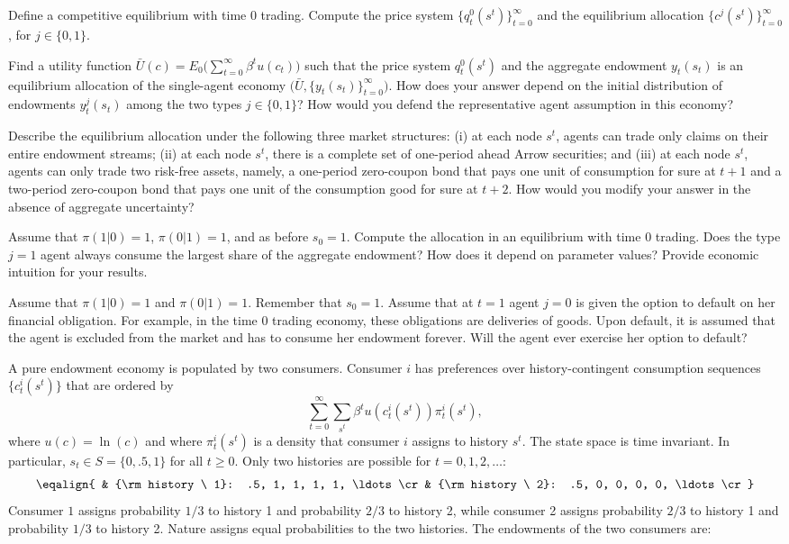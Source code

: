  Define a competitive equilibrium with time $0$
trading. Compute the price system $\{q_t^0(s^t)\}_{t=0}^{\infty}$
and the equilibrium allocation $\{c^j(s^t)\}_{t=0}^{\infty}$, for
$j \in \{0,1\}$.\medskip

 Find a utility function $\bar U(c) = E_0\bigl(
\sum_{t=0}^{\infty} \beta^t u(c_t) \bigr)$ such that the price
system $q_t^0(s^t)$ and the aggregate endowment $y_t(s_t)$ is an
equilibrium allocation of the single-agent economy $\bigl( \bar U
,\{y_t(s_t)\}_{t=0}^{\infty} \bigr)$. How does your answer depend
on the initial distribution of endowments $y_t^j(s_t)$ among the
two types $j \in \{0,1\}$? How would you defend the
representative agent assumption in this economy?\medskip

 Describe the equilibrium allocation under the
following three market structures: (i) at each node $s^t$,
agents can  trade only claims on their entire endowment streams;
(ii) at each node $s^t$, there is a complete set of one-period
ahead Arrow securities; and (iii) at each node $s^t$, agents can
only trade two risk-free assets, namely, a one-period zero-coupon bond
that pays one unit of consumption for sure at $t+1$ and a
two-period zero-coupon bond that pays one unit of the consumption good
for sure at $t+2$. How would you modify your answer in the absence
of aggregate uncertainty?\medskip

 Assume that $\pi(1|0)=1$, $\pi(0|1)=1$, and as
before $s_0=1$. Compute the allocation in an equilibrium with
time $0$ trading. Does the type $j=1$ agent always consume the
largest share of the aggregate endowment? How does it depend on
parameter values? Provide economic intuition for your results.\medskip

 Assume that $\pi(1|0)=1$ and $\pi(0|1)=1$.
Remember that $s_0=1$. Assume that at $t=1$ agent $j=0$ is given
the option to default on her financial obligation. For example, in
the time $0$ trading economy, these obligations are deliveries of
goods. Upon default, it is assumed that the agent is excluded from
the market and has to consume her endowment forever. Will the
agent ever exercise her option to default?



\medskip
{} 
\medskip
\noindent
 A pure endowment economy is populated by two consumers. Consumer $i$ has preferences over history-contingent
consumption sequences $\{c_t^i(s^t)\}$ that are ordered by
$$ \sum_{t=0}^\infty \sum_{s^t} \beta^t u(c_t^i(s^t)) \pi_t^i (s^t) ,$$
where $u(c) = \ln(c)$  and where $\pi_t^i(s^t)$ is a density that consumer $i$ assigns to history $s^t$. The state space is time invariant. In particular,
$s_t \in S = \{0, .5,  1\}$ for all $t \geq 0$.
Only two histories are possible for $t=0, 1, 2, \ldots$:
$$ \eqalign{ & {\rm history \ 1}: .5, 1, 1, 1, 1, \ldots \cr
             & {\rm history \ 2}: .5, 0, 0, 0, 0, \ldots \cr } $$
Consumer $1$ assigns probability $1/3$ to  history 1  and probability $2/3$ to history 2, while consumer 2 assigns probability
$2/3$ to history 1 and probability $1/3$ to history 2.  Nature assigns equal probabilities to the two histories.
The endowments of the two consumers are:


